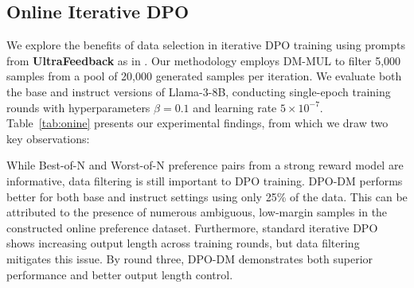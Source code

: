 {\subsection{Online Iterative DPO}
\label{exp:online}
We explore the benefits of data selection in iterative DPO training using prompts from \textbf{UltraFeedback} as in \citet{xiong2024iterative}. Our methodology employs DM-MUL to filter 5,000 samples from a pool of 20,000 generated samples per iteration. We evaluate both the base and instruct versions of Llama-3-8B, conducting single-epoch training rounds with hyperparameters $\beta=0.1$ and learning rate $5\times10^{-7}$. Table~\ref{tab:onine} presents our experimental findings, from which we draw two key observations:

While Best-of-N and Worst-of-N preference pairs from a strong reward model are informative, data filtering is still important to DPO training. DPO-DM performs better for both base and instruct settings using only 25\% of the data. This can be attributed to the presence of numerous ambiguous, low-margin samples in the constructed online preference dataset. 
Furthermore, standard iterative DPO shows increasing output length across training rounds, but data filtering mitigates this issue. By round three, DPO-DM demonstrates both superior performance and better output length control.

\begin{table}[t]
    \centering
    \setlength{\abovecaptionskip}{0.1cm}
    \setlength{\belowcaptionskip}{0cm}
    \setlength{\tabcolsep}{9pt} 
    \caption{Ablation study on model choice (\textbf{Mistral-7B-Instruct-v-0.2}). Each strategy selects a 6,000-sample subset.}
    \label{tab:abl_model}
    \tiny
    \vspace{-5pt}
\end{table}

}
